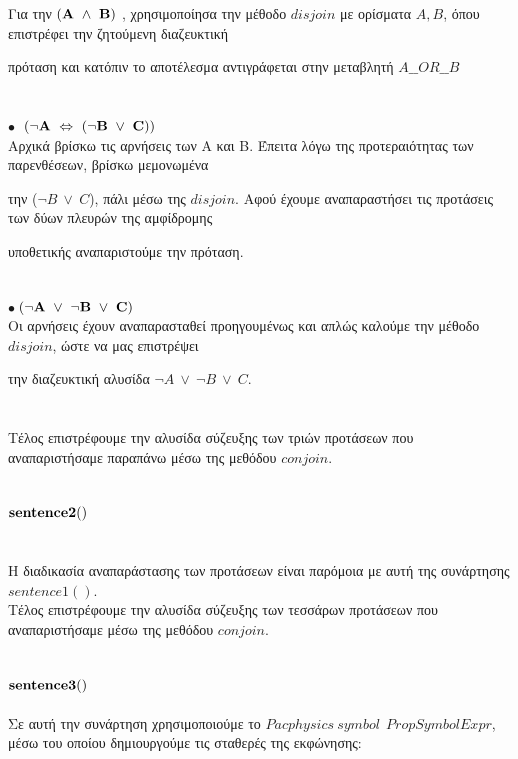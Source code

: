 \documentclass[10pt]{article}
\begin{document}
Για την  $\bf (A \ \wedge \ B)$ , χρησιμοποίησα την μέθοδο $disjoin$ με ορίσματα  $A,B$, όπου επιστρέφει την ζητούμενη διαζευκτική 

πρόταση και κατόπιν το αποτέλεσμα αντιγράφεται στην μεταβλητή $A\_\_OR\_\_B$  \\ \\ \\
$\bullet \ $ $\bf (\neg A \ \Leftrightarrow \ (\neg B \ \vee \ C) ) $
\\

Αρχικά βρίσκω τις αρνήσεις των Α και Β. Έπειτα λόγω της προτεραιότητας των παρενθέσεων, βρίσκω μεμονωμένα 

την ($\neg B \ \vee \ C$), πάλι μέσω της $disjoin$. Αφού έχουμε αναπαραστήσει τις προτάσεις των δύων πλευρών της αμφίδρομης 

υποθετικής αναπαριστούμε την πρόταση. \\ \\ \\ $\bullet \ $$\bf (\neg A \ \vee \ \neg B \ \vee \ C) $ \\ 
 
 Οι αρνήσεις έχουν αναπαρασταθεί προηγουμένως και απλώς καλούμε την μέθοδο $disjoin$, ώστε να μας επιστρέψει  
 
την διαζευκτική αλυσίδα $\neg A \ \vee \ \neg B \ \vee \ C$. \\ \\ \\
Τέλος επιστρέφουμε την αλυσίδα σύζευξης των τριών προτάσεων που αναπαριστήσαμε παραπάνω μέσω της μεθόδου $conjoin
$. \\ \\ \\
\underline{\underline{$\bf sentence2()$}} \\  \\ \\
Η διαδικασία αναπαράστασης των προτάσεων είναι παρόμοια με αυτή της συνάρτησης $sentence1()$. \\
Τέλος επιστρέφουμε την αλυσίδα σύζευξης των τεσσάρων προτάσεων που αναπαριστήσαμε μέσω της μεθόδου $conjoin$. \\ \\ \\
\underline{\underline{$\bf sentence3()$}} \\  \\ 
Σε αυτή την συνάρτηση χρησιμοποιούμε το $Pacphysics \ symbol \ \ PropSymbolExpr$,  μέσω του οποίου δημιουργούμε τις σταθερές της εκφώνησης: \\
\end{document}
